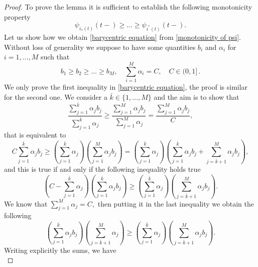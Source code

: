 \documentclass[10pt,a4paper]{amsart}
\begin{document}
\begin{proof}
To prove the lemma it is sufficient to establish the following monotonicity property
    \begin{equation}\label{monotonicity of psi}
        \psi_{i_*(t)}(t-)\geq\dots\geq\psi_{i^*(t)}(t-).
    \end{equation}
     Let us show how we obtain \eqref{barycentric equation} from \eqref{monotonicity of psi}.\newline
    Without loss of generality we suppose to have some quantities $b_i$ and $\alpha_i$ for $i=1,\dots,M$ such that
    \begin{equation}\label{eq:monotonicity_b_i}
       b_1\ge b_2\ge\dots\ge b_M, \quad\sum_{i=1}^M\alpha_i=C,\quad C\in(0,1]\,.
    \end{equation}   
    We only prove the first inequality in \eqref{barycentric equation}, the proof is similar for the second one. 
    We consider a $\bar k\in\{1,\dots,M\}$ and the aim is to show that
    \begin{equation*}
        \frac{\sum_{j=1}^{\bar k}\alpha_jb_j}{\sum_{j=1}^{\bar k}\alpha_j}\geq\frac{\sum_{j=1}^M\alpha_jb_j}
        {\sum_{j=1}^M\alpha_j}=\frac{\sum_{j=1}^M\alpha_jb_j}{C},
    \end{equation*}
    that is equivalent to
    \begin{equation*}
        C\sum_{j=1}^{\bar k}\alpha_jb_j\geq\left(\sum_{j=1}^{\bar k}\alpha_j\right)\left(\sum_{j=1}^M\alpha_jb_j\right)
        =\left(\sum_{j=1}^{\bar k}\alpha_j\right)\left(\sum_{j=1}^{\bar k}\alpha_jb_j+\sum_{j=\bar k+1}^M\alpha_jb_j\right),
    \end{equation*}
    and this is true if and only if the following inequality holds true
    \begin{equation*}
        \left(C-\sum_{j=1}^{\bar k}\alpha_j\right)\left(\sum_{j=1}^{\bar k}\alpha_jb_j \right)\geq 
        \left(\sum_{j=1}^{\bar k}\alpha_j\right)\left(\sum_{j=\bar k+1}^M\alpha_jb_j\right).
    \end{equation*}
    We know that $\sum_{j=1}^M\alpha_j=C,$ then putting it in the last inequality we obtain the following
    \begin{equation*}
        \left(\sum_{j=1}^{\bar k}\alpha_jb_j\right)\left(\sum_{j=\bar k+1}^M\alpha_j\right)
        \geq\left(\sum_{j=1}^{\bar k}\alpha_j\right)\left(\sum_{j=\bar k+1}^M\alpha_jb_j\right).
    \end{equation*}
    Writing explicitly the sums, we have
    \begin{equation*}

\end{equation*}
\end{proof}
\end{document}
